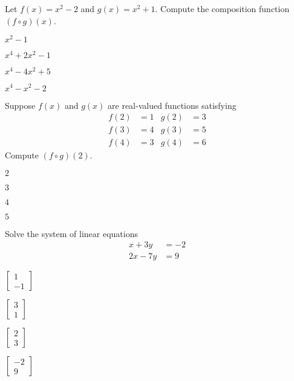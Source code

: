 \documentclass{article}
\begin{document}
\begin{readinessAssuranceTest}

\item Let $f(x) = x^2-2$ and $g(x)= x^2+1$.  Compute the composition function $(f \circ g)(x)$.
\begin{readinessAssuranceTestChoices}
\item $x^2-1$
\item $x^4+2x^2-1$
\item $x^4-4x^2+5$
\item $x^4-x^2-2$
\end{readinessAssuranceTestChoices}

\item Suppose $f(x)$ and $g(x)$ are real-valued functions satisfying
\begin{align*}
f(2) &= 1 & g(2) & = 3 \\
f(3) &= 4 & g(3) &= 5 \\
f(4) &= 3 & g(4) &= 6
\end{align*}
Compute $(f \circ g)(2)$.
\begin{readinessAssuranceTestChoices}
\item $2$
\item $3$
\item $4$
\item $5$
\end{readinessAssuranceTestChoices}


\item Solve the system of linear equations
\begin{align*}
x+3y &= -2 \\
2x-7y &= 9
\end{align*}

\begin{multicols}{4}
\begin{readinessAssuranceTestChoices}
\item $\begin{bmatrix} 1 \\ -1 \end{bmatrix}$
\item $\begin{bmatrix} 3 \\ 1 \end{bmatrix}$
\item $\begin{bmatrix} 2 \\ 3 \end{bmatrix}$
\item $\begin{bmatrix} -2 \\ 9 \end{bmatrix}$
\end{readinessAssuranceTestChoices}
\end{multicols}


\end{readinessAssuranceTest}
\end{document}
